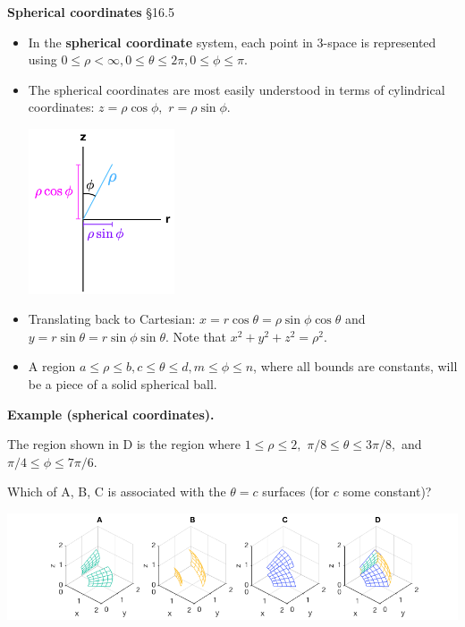 \documentclass[12pt,letterpaper,noanswers]{exam}
\begin{document}
\noindent\textbf{Spherical coordinates} \S 16.5
\begin{tcolorbox}
\begin{itemize}
\itemsep0em
    \item In the \textbf{spherical coordinate} system, each point in $3$-space is represented using $0\leq \rho < \infty, 0\leq \theta\leq 2\pi, 0 \leq \phi\leq \pi.$  
    \item The spherical coordinates are most easily understood in terms of cylindrical coordinates: $z = \rho\cos\phi,$ $r = \rho\sin\phi$.
    
    \includegraphics[width=1.7in]{img/C13spherical.png}
    
    \item Translating back to Cartesian: $x = r\cos\theta = \rho\sin\phi\cos\theta$ and $y = r\sin\theta = r\sin\phi\sin\theta$.  Note that $x^2+y^2 +z^2= \rho^2.$
    \item A region $a\leq \rho\leq b, c\leq \theta\leq d, m\leq \phi \leq n$, where all bounds are constants, will be a piece of a solid spherical ball.
    \end{itemize}
    \end{tcolorbox}
    
    \noindent\textbf{Example (spherical coordinates).}

The region shown in D is the region where $1\leq \rho \leq 2,$  $\pi/8\leq \theta\leq 3\pi/8,$ and $ \pi/4\leq \phi \leq 7\pi/6.$

Which of A, B, C is associated with the $\theta = c$ surfaces (for $c$ some constant)? 

\includegraphics[width=\linewidth]{img/C20p5.png}
\end{document}
